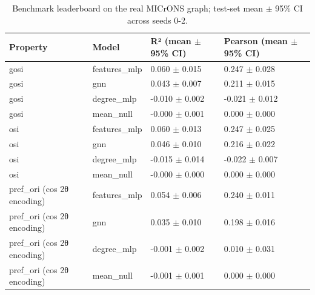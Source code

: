\begin{table}[htbp]
  \centering
  \caption{Benchmark leaderboard on the real MICrONS graph; test-set mean $\pm$ 95\% CI across seeds 0-2.}
  \label{tab:leaderboard}
  \begin{tabular}{llll}
    \toprule
    Property & Model & R² (mean $\pm$ 95\% CI) & Pearson (mean $\pm$ 95\% CI) \\
    \midrule
    gosi & features\_mlp & 0.060 $\pm$ 0.015 & 0.247 $\pm$ 0.028 \\
    gosi & gnn & 0.043 $\pm$ 0.007 & 0.211 $\pm$ 0.015 \\
    gosi & degree\_mlp & -0.010 $\pm$ 0.002 & -0.021 $\pm$ 0.012 \\
    gosi & mean\_null & -0.000 $\pm$ 0.001 & 0.000 $\pm$ 0.000 \\
    osi & features\_mlp & 0.060 $\pm$ 0.013 & 0.247 $\pm$ 0.025 \\
    osi & gnn & 0.046 $\pm$ 0.010 & 0.216 $\pm$ 0.022 \\
    osi & degree\_mlp & -0.015 $\pm$ 0.014 & -0.022 $\pm$ 0.007 \\
    osi & mean\_null & -0.000 $\pm$ 0.000 & 0.000 $\pm$ 0.000 \\
    pref\_ori (cos 2θ encoding) & features\_mlp & 0.054 $\pm$ 0.006 & 0.240 $\pm$ 0.011 \\
    pref\_ori (cos 2θ encoding) & gnn & 0.035 $\pm$ 0.010 & 0.198 $\pm$ 0.016 \\
    pref\_ori (cos 2θ encoding) & degree\_mlp & -0.001 $\pm$ 0.002 & 0.010 $\pm$ 0.031 \\
    pref\_ori (cos 2θ encoding) & mean\_null & -0.001 $\pm$ 0.001 & 0.000 $\pm$ 0.000 \\
    \bottomrule
  \end{tabular}
\end{table}
